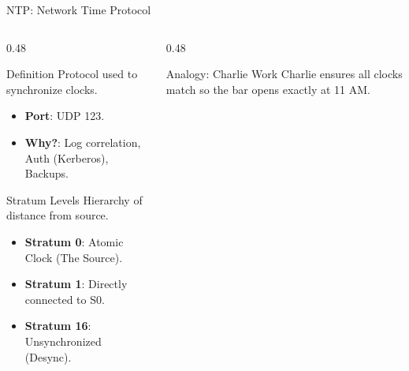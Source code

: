 \documentclass[aspectratio=169]{beamer}  %
\begin{document}
\begin{frame}{NTP: Network Time Protocol}
    \begin{columns}[T]
        \begin{column}{0.48\textwidth}
            \begin{block}{Definition}
                \small
                Protocol used to synchronize clocks.
                \begin{itemize}
                    \item \textbf{Port}: UDP 123.
                    \item \textbf{Why?}: Log correlation, Auth (Kerberos), Backups.
                \end{itemize}
            \end{block}
            \begin{exampleblock}{Stratum Levels}
                \small
                Hierarchy of distance from source.
                \begin{itemize}
                    \item \textbf{Stratum 0}: Atomic Clock (The Source).
                    \item \textbf{Stratum 1}: Directly connected to S0.
                    \item \textbf{Stratum 16}: Unsynchronized (Desync).
                \end{itemize}
            \end{exampleblock}
        \end{column}
        \begin{column}{0.48\textwidth}
            \begin{center}
            \end{center}
            \begin{exampleblock}{Analogy: Charlie Work}
                \footnotesize
                Charlie ensures all clocks match so the bar opens exactly at 11 AM.
            \end{exampleblock}
        \end{column}
    \end{columns}
\end{frame}
\end{document}
